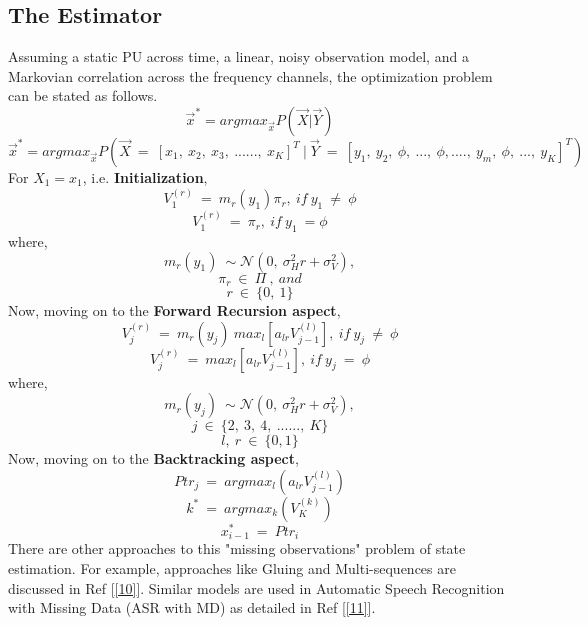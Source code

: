 \documentclass[12pt, draftcls, onecolumn]{IEEEtran}
\begin{document}
\subsection{The Estimator}
Assuming a static PU across time, a linear, noisy observation model, and a Markovian correlation across the frequency channels, the optimization problem can be stated as follows.
\begin{equation}\label{32}
    \vec{x}^* = argmax_{\vec{x}} P(\vec{X}|\vec{Y})
\end{equation}
\[\vec{x}^* = argmax_{\vec{x}} P(\vec{X}\ =\ [x_1,\ x_2,\ x_3,\ ......,\ x_K]^T\ |\ \vec{Y}\ =\ [y_1,\ y_2,\ \phi,\ ...,\ \phi,....,\ y_m,\ \phi,\ ...,\ y_K]^T)\]
For $X_1 = x_1$, i.e. \textbf{Initialization},
\[V_1^{(r)}\ =\ m_r(y_1)\pi_r,\ if\ y_1\ \neq\ \phi\]
\[V_1^{(r)}\ =\ \pi_r,\ if\ y_1\ = \phi\]
where,
\[m_r(y_1)\ \sim \mathcal{N}(0,\ \sigma_H^2r+\sigma_V^2),\]
\[\pi_r\ \in\ \Pi\ ,\ and\]
\[r\ \in\ \{0,\ 1\}\]
Now, moving on to the \textbf{Forward Recursion aspect},
\[V_j^{(r)}\ =\ m_r(y_j)\ max_l[a_{lr}V_{j-1}^{(l)}],\ if\ y_j\ \neq\ \phi\]
\[V_j^{(r)}\ =\ max_l[a_{lr}V_{j-1}^{(l)}],\ if\ y_j\ =\ \phi\]
where,
\[m_r(y_j)\ \sim \mathcal{N}(0,\ \sigma_H^2r+\sigma_V^2),\]
\[j\ \in\ \{2,\ 3,\ 4,\ ......,\ K\}\]
\[l,\ r\ \in\ \{0,1\}\]
Now, moving on to the \textbf{Backtracking aspect},
\[Ptr_j\ =\ argmax_l(a_{lr}V_{j-1}^{(l)})\]
\[k^*\ =\ argmax_k(V_K^{(k)})\]
\[x_{i-1}^*\ =\ Ptr_i\]
There are other approaches to this "missing observations" problem of state estimation. For example, approaches like Gluing and Multi-sequences are discussed in Ref [\ref{10}]. Similar models are used in Automatic Speech Recognition with Missing Data (ASR with MD) as detailed in Ref [\ref{11}].
\end{document}
